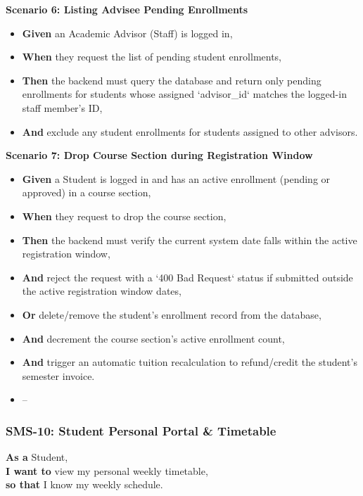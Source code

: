 \noindent\textbf{Scenario 6: Listing Advisee Pending Enrollments}\\
\begin{itemize}
  \item \textbf{Given} an Academic Advisor (Staff) is logged in,
  \item \textbf{When} they request the list of pending student enrollments,
  \item \textbf{Then} the backend must query the database and return only pending enrollments for students whose assigned `advisor\_id` matches the logged-in staff member's ID,
  \item \textbf{And} exclude any student enrollments for students assigned to other advisors.
\end{itemize}


\noindent\textbf{Scenario 7: Drop Course Section during Registration Window}\\
\begin{itemize}
  \item \textbf{Given} a Student is logged in and has an active enrollment (pending or approved) in a course section,
  \item \textbf{When} they request to drop the course section,
  \item \textbf{Then} the backend must verify the current system date falls within the active registration window,
  \item \textbf{And} reject the request with a `400 Bad Request` status if submitted outside the active registration window dates,
  \item \textbf{Or} delete/remove the student's enrollment record from the database,
  \item \textbf{And} decrement the course section's active enrollment count,
  \item \textbf{And} trigger an automatic tuition recalculation to refund/credit the student's semester invoice.
\end{itemize}

\begin{itemize}
  \item --
\end{itemize}

\subsubsection{SMS-10: Student Personal Portal \& Timetable}
\noindent \textbf{As a} Student, \\
\noindent \textbf{I want to} view my personal weekly timetable, \\
\noindent \textbf{so that} I know my weekly schedule. \\



